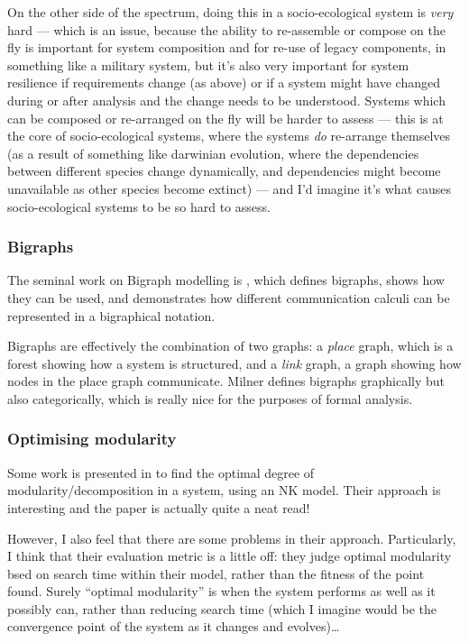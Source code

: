 \documentclass[12pt]{article}
\begin{document}
On the other side of the spectrum, doing this in a socio-ecological system is
\emph{very} hard --- which is an issue, because the ability to re-assemble or
compose on the fly is important for system composition and for re-use of legacy
components, in something like a military system, but it's also very important
for system resilience if requirements change (as above) or if a system might
have changed during or after analysis and the change needs to be understood.
Systems which can be composed or re-arranged on the fly will be harder to assess
--- this is at the core of socio-ecological systems, where the systems \emph{do}
re-arrange themselves (as a result of something like darwinian evolution, where
the dependencies between different species change dynamically, and dependencies
might become unavailable as other species become extinct) --- and I'd imagine
it's what causes socio-ecological systems to be so hard to assess.\par

\subsubsection{Bigraphs}\label{review:milner2009space}


The seminal work on Bigraph modelling is \cite{milner2009space}, which defines
bigraphs, shows how they can be used, and demonstrates how different
communication calculi can be represented in a bigraphical notation.\par

Bigraphs are effectively the combination of two graphs: a \emph{place} graph,
which is a forest showing how a system is structured, and a \emph{link} graph, a
graph showing how nodes in the place graph communicate. Milner defines bigraphs
graphically but also categorically, which is really nice for the purposes of
formal analysis.\par


\subsubsection{Optimising modularity}

Some work is presented in \cite{frenken2012optimal} to find the optimal degree
of modularity/decomposition in a system, using an NK model. Their approach is
interesting and the paper is actually quite a neat read! 

However, I also feel that there are some problems in their approach.
Particularly, I think that their evaluation metric is a little off: they judge
optimal modularity bsed on search time within their model, rather than the
fitness of the point found. Surely ``optimal modularity'' is when the system
performs as well as it possibly can, rather than reducing search time (which I
imagine would be the convergence point of the system as it changes and
evolves)\ldots\par 
\end{document}
